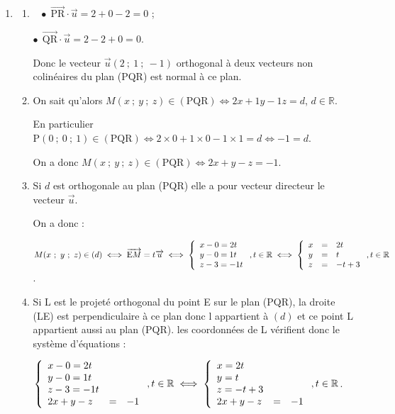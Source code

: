 \documentclass[10pt]{article}
\providecommand{\R}{\mathbb{R}}
\providecommand{\vect}[1]{\overrightarrow{#1}}
\begin{document}
\begin{enumerate}
Les vecteurs $\vect{\text{PR}}$ et $\vect{\text{QR}}$ ne sont pas colinéaires donc les points P{}, Q et R ne sont pas alignés : les points P{}, Q et R définissent un plan.
\item 
	\begin{enumerate}
		\item ~
$\bullet~~$$\vect{\text{PR}} \cdot \vect{u} = 2 +  0 - 2 = 0$ ;

$\bullet~~$$\vect{\text{QR}} \cdot \vect{u} = 2 - 2 + 0  = 0$.

Donc le vecteur $\vect{u}(2~;~1~;~- 1)$ orthogonal à deux vecteurs non colinéaires du plan (PQR) est normal à ce plan.
		\item 
On sait qu'alors $M(x~;~y~;~z) \in (\text{PQR}) \iff 2x + 1y - 1z = d$, \: $d \in \R$.

En particulier $\text{P}(0~;~0~;~1) \in (\text{PQR}) \iff 2\times 0  + 1\times 0 - 1 \times 1 = d \iff - 1 = d$.

On a donc $M(x~;~y~;~z) \in (\text{PQR}) \iff 2x + y - z = - 1$.
		\item 
Si $d$ est orthogonale au plan (PQR) elle a pour vecteur directeur le vecteur $\vect{u}$.

On a donc :

$M(x~;~y~;~z) \in (d) \iff \vect{\text{E}M} = t\vect{u}\iff \left\{\begin{array}{l c l}
x - 0 = 2t\\
y - 0= 1t\\
z - 3 = -1t
\end{array}\right., t \in \R \iff \left\{\begin{array}{l c l}
x&=& 2t\\
y&=& t\\
z &=& -t + 3
\end{array}\right., t \in \R$.
		\item 
Si L est le projeté orthogonal du point E sur le plan (PQR), la droite (LE) est perpendiculaire à ce plan donc l appartient à $(d)$ et ce point L appartient aussi au plan (PQR). les coordonnées de L vérifient donc le système d'équations :

$\left\{\begin{array}{l c l}
x - 0 = 2t\\
y - 0= 1t\\
z - 3 = -1t\\
2x + y - z &=& - 1
\end{array}\right., t \in \R \iff \left\{\begin{array}{l c l}
x= 2t\\
y= t\\
z= -t + 3\\
2x + y - z &=& - 1
\end{array}\right., t \in \R$.


\end{enumerate}
\end{enumerate}
\end{document}
